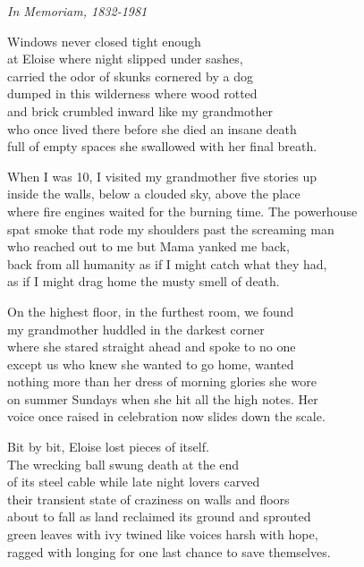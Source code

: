 \documentclass[twoside,10pt]{book}
\begin{document}
\emph{In Memoriam, 1832-1981}

Windows never closed tight enough\\
at Eloise where night slipped under sashes,\\
carried the odor of skunks cornered by a dog\\
dumped in this wilderness where wood rotted\\
and brick crumbled inward like my grandmother\\
who once lived there before she died an insane death\\
full of empty spaces she swallowed with her final breath.

When I was 10, I visited my grandmother five stories up\\
inside the walls, below a clouded sky, above the place\\
where fire engines waited for the burning time. The powerhouse\\
spat smoke that rode my shoulders past the screaming man\\
who reached out to me but Mama yanked me back,\\
back from all humanity as if I might catch what they had,\\
as if I might drag home the musty smell of death.

On the highest floor, in the furthest room, we found\\
my grandmother huddled in the darkest corner\\
where she stared straight ahead and spoke to no one\\
except us who knew she wanted to go home, wanted\\
nothing more than her dress of morning glories she wore\\
on summer Sundays when she hit all the high notes. Her\\
voice once raised in celebration now slides down the scale.

Bit by bit, Eloise lost pieces of itself.\\
The wrecking ball swung death at the end\\
of its steel cable while late night lovers carved\\
their transient state of craziness on walls and floors\\
about to fall as land reclaimed its ground and sprouted\\
green leaves with ivy twined like voices harsh with hope,\\
ragged with longing for one last chance to save themselves.
\end{document}
